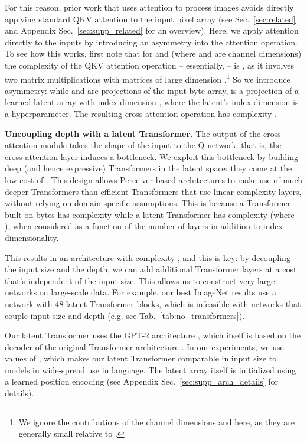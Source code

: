 \documentclass{article}
\begin{document}
For this reason, prior work that uses attention to process images avoids directly applying standard QKV attention to the input pixel array (see Sec.~\ref{sec:related} and Appendix Sec.~\ref{sec:supp_related} for an overview). Here, we apply attention directly to the inputs by introducing an asymmetry into the attention operation. To see how this works, first note that for   and  (where  and  are channel dimensions) the complexity of the QKV attention operation -- essentially,  -- is , as it involves two matrix multiplications with matrices of large dimension .\footnote{We ignore the contributions of the channel dimensions  and  here, as they are generally small relative to .} So we introduce asymmetry: while  and  are projections of the input byte array,  is a projection of a learned latent array with index dimension , where the latent's index dimension  is a hyperparameter. The resulting cross-attention operation has complexity .

\noindent \textbf{Uncoupling depth with a latent Transformer.}
The output of the cross-attention module takes the shape of the input to the Q network: that is, the cross-attention layer induces a bottleneck. We exploit this bottleneck by building deep (and hence expressive) Transformers in the latent space: they come at the low cost of . This design allows Perceiver-based architectures to make use of much deeper Transformers than efficient Transformers that use linear-complexity layers, without relying on domain-specific assumptions. This is because a Transformer built on bytes has complexity  while a latent Transformer has complexity  (where ), when considered as a function of the number of layers  in addition to index dimensionality. 

This results in an architecture with complexity , and this is key: by decoupling the input size and the depth, we can add additional Transformer layers at a cost that's independent of the input size. This allows us to construct very large networks on large-scale data. For example, our best ImageNet results use a network with 48 latent Transformer blocks, which is infeasible with networks that couple input size and depth (e.g. see Tab.~\ref{tab:no_transformers}).

Our latent Transformer uses the GPT-2 architecture \cite{radford2019language}, which itself is based on the decoder of the original Transformer architecture \cite{vaswani2017attention}. In our experiments, we use values of , which makes our latent Transformer comparable in input size to models in wide-spread use in language. The latent array itself is initialized using a learned position encoding \cite{gehring2017convolutional} (see Appendix Sec.~\ref{sec:supp_arch_details} for details).
\end{document}

